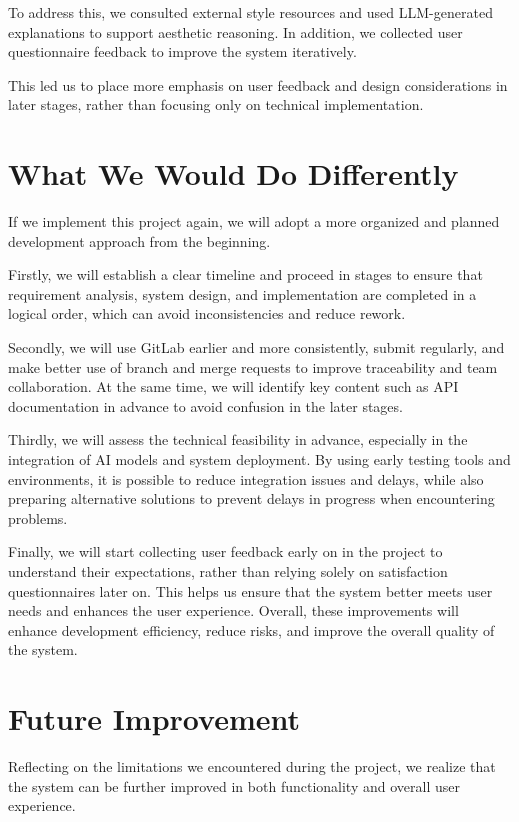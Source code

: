 To address this, we consulted external style resources and used LLM-generated explanations to support aesthetic reasoning. In addition, we collected user questionnaire feedback to improve the system iteratively.

This led us to place more emphasis on user feedback and design considerations in later stages, rather than focusing only on technical implementation.

\section{What We Would Do Differently}
If we implement this project again, we will adopt a more organized and planned development approach from the beginning.

Firstly, we will establish a clear timeline and proceed in stages to ensure that requirement analysis, system design, and implementation are completed in a logical order, which can avoid inconsistencies and reduce rework.

Secondly, we will use GitLab earlier and more consistently, submit regularly, and make better use of branch and merge requests to improve traceability and team collaboration. At the same time, we will identify key content such as API documentation in advance to avoid confusion in the later stages.

Thirdly, we will assess the technical feasibility in advance, especially in the integration of AI models and system deployment. By using early testing tools and environments, it is possible to reduce integration issues and delays, while also preparing alternative solutions to prevent delays in progress when encountering problems.

Finally, we will start collecting user feedback early on in the project to understand their expectations, rather than relying solely on satisfaction questionnaires later on. This helps us ensure that the system better meets user needs and enhances the user experience.
Overall, these improvements will enhance development efficiency, reduce risks, and improve the overall quality of the system.



\section{Future Improvement}

Reflecting on the limitations we encountered during the project, we realize that the system can be further improved in both functionality and overall user experience.

